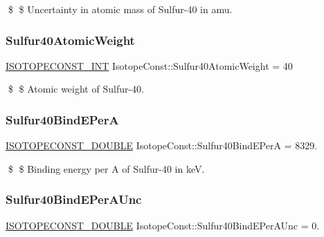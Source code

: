 \$ \$ Uncertainty in atomic mass of Sulfur-\/40 in amu. \mbox{\label{group___isotope_const-_sulfur-_s40_ga8a5e3e5ce45439580402196f47fd59f8}} 
\subsubsection{\texorpdfstring{Sulfur40\+Atomic\+Weight}{Sulfur40AtomicWeight}}
{\footnotesize\ttfamily \mbox{\hyperlink{group___isotope_const-_macros_ga5f18360b3e99483a35c32d789e62621c}{I\+S\+O\+T\+O\+P\+E\+C\+O\+N\+S\+T\+\_\+\+I\+NT}} Isotope\+Const\+::\+Sulfur40\+Atomic\+Weight = 40}

\$ \$ Atomic weight of Sulfur-\/40. \mbox{\label{group___isotope_const-_sulfur-_s40_gad57266f86b5ae0552afa25ef52db2aed}} 
\subsubsection{\texorpdfstring{Sulfur40\+Bind\+E\+PerA}{Sulfur40BindEPerA}}
{\footnotesize\ttfamily \mbox{\hyperlink{group___isotope_const-_macros_ga8f45a7272ce02c0b4c65c44636ed719a}{I\+S\+O\+T\+O\+P\+E\+C\+O\+N\+S\+T\+\_\+\+D\+O\+U\+B\+LE}} Isotope\+Const\+::\+Sulfur40\+Bind\+E\+PerA = 8329.}

\$ \$ Binding energy per A of Sulfur-\/40 in keV. \mbox{\label{group___isotope_const-_sulfur-_s40_ga351dedaf6ec9fc328fe80036d84b6bcd}} 
\subsubsection{\texorpdfstring{Sulfur40\+Bind\+E\+Per\+A\+Unc}{Sulfur40BindEPerAUnc}}
{\footnotesize\ttfamily \mbox{\hyperlink{group___isotope_const-_macros_ga8f45a7272ce02c0b4c65c44636ed719a}{I\+S\+O\+T\+O\+P\+E\+C\+O\+N\+S\+T\+\_\+\+D\+O\+U\+B\+LE}} Isotope\+Const\+::\+Sulfur40\+Bind\+E\+Per\+A\+Unc = 0.}

